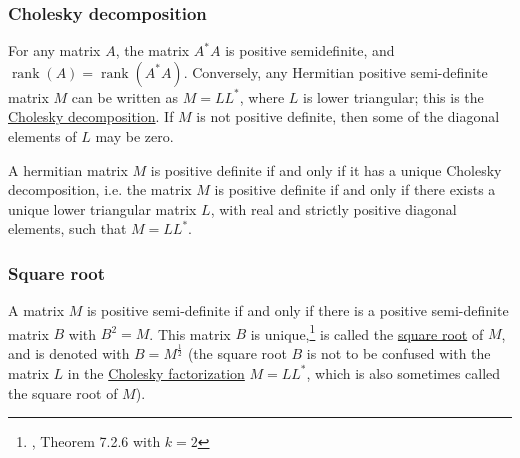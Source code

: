 %
%

\hypertarget{cholesky-decomposition}{%
\subsubsection{Cholesky decomposition}\label{cholesky-decomposition}}

For any matrix \(A\), the matrix \(A^* A\) is positive semidefinite, and
\(\operatorname{rank}(A) = \operatorname{rank}(A^* A)\). Conversely, any
Hermitian positive semi-definite matrix \(M\) can be written as
\(M = LL^*\), where \(L\) is lower triangular; this is the
\href{Cholesky_decomposition}{Cholesky decomposition}. If \(M\) is not
positive definite, then some of the diagonal elements of \(L\) may be
zero.

A hermitian matrix \(M\) is positive definite if and only if it has a
unique Cholesky decomposition, i.e. the matrix \(M\) is positive
definite if and only if there exists a unique lower triangular matrix
\(L\), with real and strictly positive diagonal elements, such that
\(M = LL^*\).

\hypertarget{square-root}{%
\subsubsection{Square root}\label{square-root}}

A matrix \(M\) is positive semi-definite if and only if there is a
positive semi-definite matrix \(B\) with \(B^2 = M\). This matrix \(B\)
is unique,\footnote{, Theorem 7.2.6 with \(k = 2\)} is called the
\href{square_root_of_a_matrix}{square root} of \(M\), and is denoted
with \(B = M^\frac{1}{2}\) (the square root \(B\) is not to be confused
with the matrix \(L\) in the \href{Cholesky_factorization}{Cholesky
factorization} \(M = LL^*\), which is also sometimes called the square
root of \(M\)).

